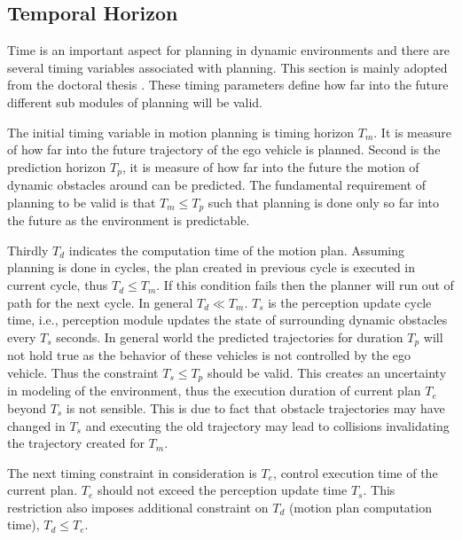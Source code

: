 \subsection{Temporal Horizon} \label{timing_constraints}
Time is an important aspect for planning in dynamic environments and there are several timing variables associated with planning. This section is mainly adopted from the doctoral thesis \cite{eth_timing_constraints}. These timing parameters define how far into the future different sub modules of planning will be valid. 

The initial timing variable in motion planning is timing horizon $ T_m $. It is measure of how far into the future trajectory of the ego vehicle is planned. Second is the prediction horizon $ T_p $, it is measure of how far into the future the motion of dynamic obstacles around can be predicted. The fundamental requirement of planning to be valid is that $ T_m  \le  T_p $ such that planning is done only so far into the future as the environment is predictable. 

Thirdly $ T_d $ indicates the computation time of the motion plan. Assuming planning is done in cycles, the plan created in previous cycle is executed in current cycle, thus $ T_d  \le  T_m $. If this condition fails then the planner will run out of path for the next cycle. In general $ T_d \ll T_m $. $ T_s $ is the perception update cycle time, i.e., perception module updates the state of surrounding dynamic obstacles every $ T_s $ seconds. In general world the predicted trajectories for duration $ T_p $ will not hold true as the behavior of these vehicles is not controlled by the ego vehicle. Thus the constraint $ T_s  \le T_p $ should be valid. This creates an uncertainty in modeling of the environment, thus the execution duration of current plan $ T_e $ beyond $ T_s $ is not sensible. This is due to fact that obstacle trajectories may have changed in $ T_s $ and executing the old trajectory may lead to collisions invalidating the trajectory created for $ T_m $. 


The next timing constraint in consideration is $ T_e $, control execution time of the current plan. $ T_e $ should not exceed the perception update time $ T_s $. This restriction also imposes additional constraint on $ T_d $ (motion plan computation time), $ T_d \le T_e $. 

